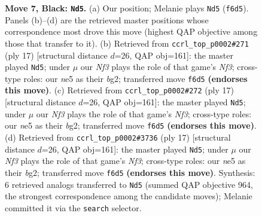 \documentclass[11pt]{article}
\begin{document}
\begin{figure}[p]
\caption{\textbf{Move 7, Black: \texttt{Nd5}.} (a) Our position; Melanie plays \texttt{Nd5} (\texttt{f6d5}). Panels (b)--(d) are the retrieved master positions whose correspondence most drove this move (highest QAP objective among those that transfer to it). (b) Retrieved from \texttt{ccrl\_top\_p0002\#271} (ply 17) [structural distance $d$=26, QAP obj=161]: the master played \texttt{Nd5}; under $\mu$ our \emph{Nf3} plays the role of that game's \emph{Nf3}; cross-type roles: our \emph{n}e5 as their \emph{b}g2; transferred move \texttt{f6d5} \textbf{(endorses this move)}. (c) Retrieved from \texttt{ccrl\_top\_p0002\#272} (ply 17) [structural distance $d$=26, QAP obj=161]: the master played \texttt{Nd5}; under $\mu$ our \emph{Nf3} plays the role of that game's \emph{Nf3}; cross-type roles: our \emph{n}e5 as their \emph{b}g2; transferred move \texttt{f6d5} \textbf{(endorses this move)}. (d) Retrieved from \texttt{ccrl\_top\_p0002\#3736} (ply 17) [structural distance $d$=26, QAP obj=161]: the master played \texttt{Nd5}; under $\mu$ our \emph{Nf3} plays the role of that game's \emph{Nf3}; cross-type roles: our \emph{n}e5 as their \emph{b}g2; transferred move \texttt{f6d5} \textbf{(endorses this move)}. Synthesis: 6 retrieved analogs transferred to \texttt{Nd5} (summed QAP objective 964, the strongest correspondence among the candidate moves); Melanie committed it via the \texttt{search} selector.}
\label{fig:thought-m13}
\end{figure}

\clearpage
\end{document}
